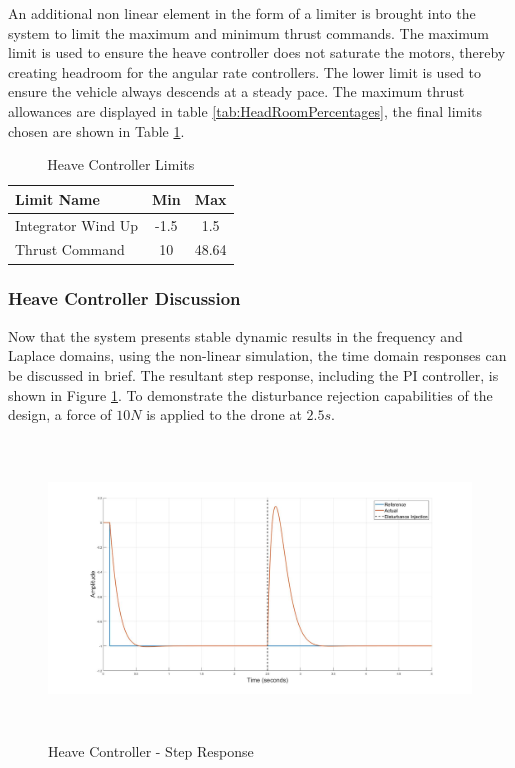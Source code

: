 	 An additional non linear element in the form of a limiter is brought into the system to limit the maximum and minimum thrust commands. The maximum limit is used to ensure the heave controller does not saturate the motors, thereby creating headroom for the angular rate controllers. The lower limit is used to ensure the vehicle always descends at a steady pace. The maximum thrust allowances are displayed in table \ref{tab:HeadRoomPercentages}, the final limits chosen are shown in Table \ref{tab:HeaveLimits}.
	 
	 \begin{table}[!]
	 	\centering
	 	\begin{tabular}{l | c | c |}
	 		Limit Name 				& Min & Max\\
	 		\hline\hline
	 		Integrator Wind Up 	   	& -1.5 	& 1.5 \\
	 		Thrust Command 		    & 10	& 48.64 \\
	 	\end{tabular}
	 	\caption{Heave Controller Limits}
	 	\label{tab:HeaveLimits}
	 \end{table}
	 
		 \subsubsection{Heave Controller Discussion}
		 Now that the system presents stable dynamic results in the frequency and Laplace domains, using the non-linear simulation, the time domain responses can be discussed in brief. The resultant step response, including the PI controller, is shown in Figure \ref{IM_HeaveStepDist}. To demonstrate the disturbance rejection capabilities of the design, a force of $10N$ is applied to the drone at $2.5s$.
		 
		 \begin{figure}[H]
		 	\centering
		 	\includegraphics[height = 7.9cm]{../Design/Matlab/Controllers/heave_step.jpg}
		 	\caption{Heave Controller -  Step Response}
		 	\label{IM_HeaveStepDist}
		 \end{figure}
		 

